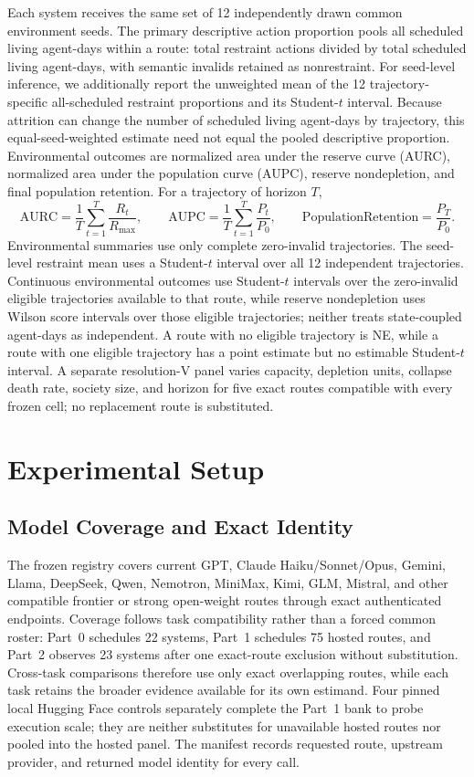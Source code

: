 \documentclass{article}
\begin{document}
Each system receives the same set of 12 independently drawn common environment seeds.
The primary descriptive action proportion pools all scheduled living agent-days within a route: total restraint actions divided by total scheduled living agent-days, with semantic invalids retained as nonrestraint.
For seed-level inference, we additionally report the unweighted mean of the 12 trajectory-specific all-scheduled restraint proportions and its Student-$t$ interval. Because attrition can change the number of scheduled living agent-days by trajectory, this equal-seed-weighted estimate need not equal the pooled descriptive proportion.
Environmental outcomes are normalized area under the reserve curve (AURC), normalized area under the population curve (AUPC), reserve nondepletion, and final population retention.
For a trajectory of horizon $T$,
\[
  \mathrm{AURC}=\frac{1}{T}\sum_{t=1}^{T}\frac{R_t}{R_{\max}},
  \qquad
  \mathrm{AUPC}=\frac{1}{T}\sum_{t=1}^{T}\frac{P_t}{P_0},
  \qquad
  \mathrm{PopulationRetention}=\frac{P_T}{P_0}.
\]
Environmental summaries use only complete zero-invalid trajectories. The seed-level restraint mean uses a Student-$t$ interval over all 12 independent trajectories. Continuous environmental outcomes use Student-$t$ intervals over the zero-invalid eligible trajectories available to that route, while reserve nondepletion uses Wilson score intervals over those eligible trajectories; neither treats state-coupled agent-days as independent. A route with no eligible trajectory is NE, while a route with one eligible trajectory has a point estimate but no estimable Student-$t$ interval.
A separate resolution-V panel varies capacity, depletion units, collapse death rate, society size, and horizon for five exact routes compatible with every frozen cell; no replacement route is substituted.

\section{Experimental Setup}
\subsection{Model Coverage and Exact Identity}
The frozen registry covers current GPT, Claude Haiku/Sonnet/Opus, Gemini, Llama, DeepSeek, Qwen, Nemotron, MiniMax, Kimi, GLM, Mistral, and other compatible frontier or strong open-weight routes through exact authenticated endpoints.
Coverage follows task compatibility rather than a forced common roster: Part~0 schedules 22 systems, Part~1 schedules 75 hosted routes, and Part~2 observes 23 systems after one exact-route exclusion without substitution.
Cross-task comparisons therefore use only exact overlapping routes, while each task retains the broader evidence available for its own estimand.
Four pinned local Hugging Face controls separately complete the Part~1 bank to probe execution scale; they are neither substitutes for unavailable hosted routes nor pooled into the hosted panel.
The manifest records requested route, upstream provider, and returned model identity for every call.
\end{document}
